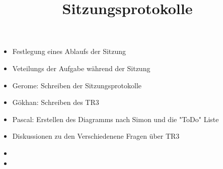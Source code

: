 \documentclass{article}
\title{Sitzungsprotokolle}
\date{}             %
\begin{document}
 



\maketitle



\textbf{ }






\begin{itemize}[label={\Square}] 

\item Festlegung eines Ablaufs der Sitzung

\item Veteilungs der Aufgabe während der Sitzung

\addvspace{15mm}

\item Gerome: Schreiben der Sitzungsprotokolle
\addvspace{15mm}
\item Gökhan: Schreiben des TR3
\addvspace{15mm}
\item Pascal: Erstellen des Diagramms nach Simon und die "ToDo" Liste

\item Diskussionen zu den Verschiedenene Fragen über TR3

\item 

\item

\end{itemize} 

\bigskip 
\end{document}
